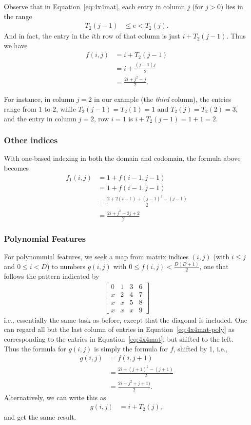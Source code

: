 \documentclass{article} %
\begin{document}
Observe that in Equation~\ref{eq:4x4mat}, each entry in column $j$ (for $j > 0$) lies in the range
\begin{align}
T_2(j-1) &\le e < T_2(j).
\end{align}
\noindent
And in fact, the entry in the $i$th row of that column is just $i + T_2(j-1)$. Thus we have
\begin{align}
f(i, j) 
&= i + T_2(j-1)\\
&= i + \frac{(j-1)j}{2}\\
&=  \frac{2i + j^2-j}{2}.
\end{align}

For instance, in column $j = 2$ in our example (the \emph{third} column), the entries range from $1$ to $2$, while $T_2(j-1) = T_2(1) = 1$ and $T_2(j) = T_2(2) = 3$, and the entry in column $j = 2$, row $i = 1$ is 
$i + T_2(j-1) = 1 + 1 = 2$. 

\subsubsection{Other indices}
With one-based indexing in both the domain and codomain, the formula above becomes
\begin{align}
f_1(i, j) &= 1+ f(i-1, j-1) \\
&= 1+ f(i-1, j-1) \\
& = \frac{2 + 2(i-1) + (j-1)^2-(j-1)}{2}\\
& = \frac{2i + j^2 - 3j + 2}{2}
\end{align}

\subsubsection{Polynomial Features}
For polynommial features, we seek a map from matrix indices $(i, j)$ (with $i \le j$ and $0 \le i < D$) to numbers $g(i, j)$ with $0 \le f(i, j) < \frac{D(D+1)}{2}$, one that follows the pattern indicated by 
\begin{align}
\begin{bmatrix}
 0 & 1 & 3 & 6 \\
 x & 2 & 4 & 7\\
 x & x & 5 & 8 \\
 x & x & x & 9
\end{bmatrix}
\label{eq:4x4mat-poly}
\end{align}
i.e., essentially the same task as before, except that the diagonal is included. One can regard all but the last column of entries in Equation~\ref{eq:4x4mat-poly} as corresponding to the entries in Equation~\ref{eq:4x4mat}, but shifted to the left. Thus the formula for $g(i, j)$ is simply the formula for $f$, shifted by 1, i.e., 
\begin{align}
g(i, j) &= f(i, j+1)  \\
&=  \frac{2i + (j+1)^2-(j+1)}{2}\\
&=  \frac{2i + j^2 + j + 1)}{2}.
\end{align}
Alternatively, we can write this as
\begin{align}
g(i, j) &= i + T_2(j),
\end{align}
\noindent
and get the same result. 
\end{document}
